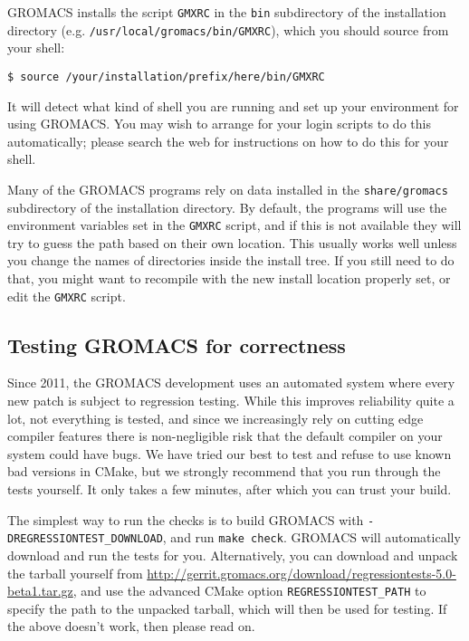 \documentclass{article}[12pt,a4paper,twoside]
\newcommand{\gromacs}{GROMACS}
\newcommand{\cmake}{CMake}
\begin{document}
\begin{enumerate}
\gromacs{} installs the script \verb+GMXRC+ in the \verb+bin+
subdirectory of the installation directory
(e.g. \verb+/usr/local/gromacs/bin/GMXRC+), which you should source
from your shell:
\begin{verbatim}
$ source /your/installation/prefix/here/bin/GMXRC
\end{verbatim}

It will detect what kind of shell you are running and set up your
environment for using \gromacs{}. You may wish to arrange for your
login scripts to do this automatically; please search the web for
instructions on how to do this for your shell. 

Many of the \gromacs{} programs rely on data installed in the
\verb+share/gromacs+ subdirectory of the installation directory. By
default, the programs will use the environment variables set in the
\verb+GMXRC+ script, and if this is not available they will try to guess the
path based on their own location.  This usually works well unless you
change the names of directories inside the install tree. If you still
need to do that, you might want to recompile with the new install
location properly set, or edit the \verb+GMXRC+ script.

\subsection{Testing \gromacs{} for correctness}\label{testing}
Since 2011, the \gromacs{} development uses an automated system where
every new patch is subject to regression testing. While this improves
reliability quite a lot, not everything is tested, and since we
increasingly rely on cutting edge compiler features there is
non-negligible risk that the default compiler on your system could
have bugs. We have tried our best to test and refuse to use known bad
versions in \cmake{}, but we strongly recommend that you run through
the tests yourself. It only takes a few minutes, after which you can
trust your build.

The simplest way to run the checks is to build \gromacs{} with
\verb+-DREGRESSIONTEST_DOWNLOAD+, and run \verb+make check+.
\gromacs{} will automatically download and run the tests for you.
Alternatively, you can download and unpack the tarball yourself from
\url{http://gerrit.gromacs.org/download/regressiontests-5.0-beta1.tar.gz},
and use the advanced \cmake{} option \verb+REGRESSIONTEST_PATH+ to
specify the path to the unpacked tarball, which will then be used for
testing. If the above doesn't work, then please read on.


\end{enumerate}
\end{document}
